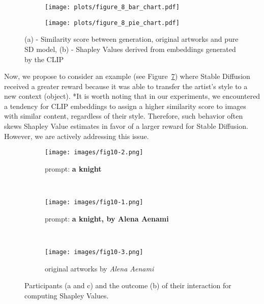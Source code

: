 \documentclass[12pt, letterpaper]{article}
\begin{document}
\begin{figure}[h]
  \centering
  \begin{subfigure}[b]{0.6\textwidth}
    \texttt{[image: plots/figure\_8\_bar\_chart.pdf]}
    \caption{}
        \label{fig8:image1}
  \end{subfigure}%
  \begin{subfigure}[b]{0.4\textwidth}
    \texttt{[image: plots/figure\_8\_pie\_chart.pdf]}
    \caption{}
        \label{fig8:image2}
  \end{subfigure}
 \captionsetup{justification=centering}
  \caption{(a) - Similarity score between generation, original artworks and pure SD model, (b) - Shapley Values derived from embeddings generated by the CLIP}
  \label{fig8}
\end{figure}

Now, we propose to consider an example (see Figure~\ref{fig10:stacked_images}) where Stable Diffusion received a greater reward because it was able to transfer the artist's style to a new context (object).
*It is worth noting that in our experiments, we encountered a tendency for CLIP embeddings to assign a higher similarity score to images with similar content, regardless of their style. Therefore, such behavior often skews Shapley Value estimates in favor of a larger reward for Stable Diffusion. However, we are actively addressing this issue.

\begin{figure}[h]
    \centering
    
    \begin{subfigure}{\textwidth}
        \centering
        \texttt{[image: images/fig10-2.png]}
        \caption{prompt: \textbf{a knight}}
        \label{fig10:sub1}
    \end{subfigure}
    \\
    
    \begin{subfigure}{\textwidth}
        \centering
        \texttt{[image: images/fig10-1.png]}
        \caption{prompt: \textbf{a knight,  by Alena Aenami}}
        \label{fig10:sub2}
    \end{subfigure}
    \\
   
    \begin{subfigure}{\textwidth}
        \centering
        \texttt{[image: images/fig10-3.png]}
        \caption{original artworks by \textit{Alena Aenami}}
        \label{fig10:sub3}
    \end{subfigure}    

    \caption{Participants (a and c) and the outcome (b) of their interaction for computing Shapley Values.}
    \label{fig10:stacked_images}
\end{figure}
\end{document}
